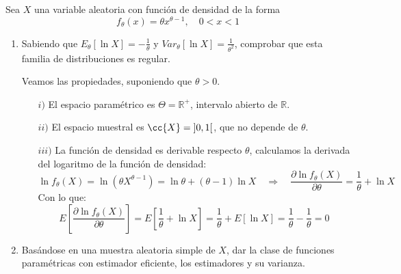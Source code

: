 \begin{ejercicio}\label{ej:10_rel4} 
    Sea $X$ una variable aleatoria con función de densidad de la forma
    \begin{equation*}
        f_\theta(x) = \theta x^{\theta-1}, \quad 0<x<1
    \end{equation*}
    \begin{enumerate}[label=\alph*)]
        \item Sabiendo que $E_\theta[\ln X] = -\frac{1}{\theta}$ y $Var_\theta[\ln X] = \frac{1}{\theta^2}$, comprobar que esta familia de distribuciones es regular.

            Veamos las propiedades, suponiendo que $\theta > 0$.
            \begin{enumerate}
                \item[$i)$] El espacio paramétrico es $\Theta = \mathbb{R}^+$, intervalo abierto de $\mathbb{R}$.
                \item[$ii)$] El espacio muestral es $\cc{X} = \left]0,1\right[$, que no depende de $\theta$.
                \item[$iii)$] La función de densidad es derivable respecto $\theta$, calculamos la derivada del logaritmo de la función de densidad:
                    \begin{equation*}
                        \ln f_\theta(X) = \ln(\theta X^{\theta-1}) = \ln\theta + (\theta-1)\ln X \quad \Longrightarrow \quad \dfrac{\partial \ln f_\theta(X)}{\partial \theta} = \frac{1}{\theta} + \ln X
                    \end{equation*}
                    Con lo que:
                    \begin{equation*}
                        E\left[\dfrac{\partial \ln f_\theta(X)}{\partial \theta}\right] = E\left[\frac{1}{\theta} + \ln X\right] = \frac{1}{\theta} + E[\ln X] = \frac{1}{\theta} - \frac{1}{\theta} = 0
                    \end{equation*}
            \end{enumerate}
        \item Basándose en una muestra aleatoria simple de $X$, dar la clase de funciones paramétricas con estimador eficiente, los estimadores y su varianza.


\end{enumerate}
\end{ejercicio}
